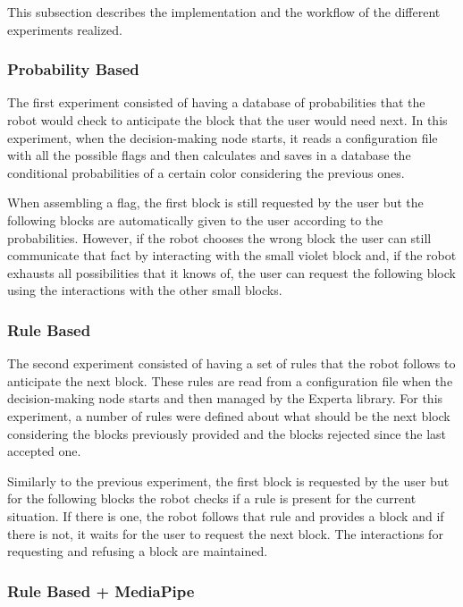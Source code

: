 This subsection describes the implementation and the workflow of the different experiments realized.

\subsubsection{Probability Based}

The first experiment consisted of having a database of probabilities that the robot would check to anticipate the block that the user would need next. In this experiment, when the decision-making node starts, it reads a configuration file with all the possible flags and then calculates and saves in a database the conditional probabilities of a certain color considering the previous ones.

When assembling a flag, the first block is still requested by the user but the following blocks are automatically given to the user according to the probabilities. However, if the robot chooses the wrong block the user can still communicate that fact by interacting with the small violet block and, if the robot exhausts all possibilities that it knows of, the user can request the following block using the interactions with the other small blocks.

\subsubsection{Rule Based}

The second experiment consisted of having a set of rules that the robot follows to anticipate the next block. These rules are read from a configuration file when the decision-making node starts and then managed by the Experta library. For this experiment, a number of rules were defined about what should be the next block considering the blocks previously provided and the blocks rejected since the last accepted one.

Similarly to the previous experiment, the first block is requested by the user but for the following blocks the robot checks if a rule is present for the current situation. If there is one, the robot follows that rule and provides a block and if there is not, it waits for the user to request the next block. The interactions for requesting and refusing a block are maintained.

\subsubsection{Rule Based + MediaPipe}

